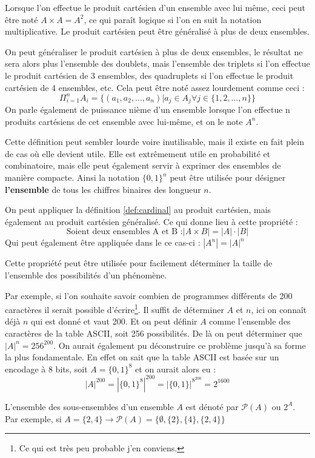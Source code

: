 Lorsque l'on effectue le produit cartésien d'un ensemble avec lui même, ceci peut être noté $A \times A = A^2$, ce qui paraît logique si l'on en suit la notation multiplicative. Le produit cartésien peut être généralisé à plus de deux ensembles.
\begin{mydef}\label{def:produit_cartésien_généralisé}
    On peut généraliser le produit cartésien à plus de deux ensembles, le résultat ne sera alors plus l'ensemble des doublets, mais l'ensemble des triplets si l'on effectue le produit cartésien de 3 ensembles, des quadruplets si l'on effectue le produit cartésien de 4 ensembles, etc.
    Cela peut être noté assez lourdement comme ceci :
    $$ \Pi_{i=1}^n A_i = \{(a_1, a_2, ..., a_n)| a_j \in A_j \forall j \in \{1,2,...,n\}\} $$
    On parle également de puissance nième d'un ensemble lorsque l'on effectue n produits cartésiens de cet ensemble avec lui-même, et on le note $A^n$.
\end{mydef}
Cette définition peut sembler lourde voire inutilisable, mais il existe en fait plein de cas où elle devient utile. Elle est extrêmement utile en probabilité et combinatoire, mais elle peut également servir à exprimer des ensembles de manière compacte. Ainsi la notation $ \{0,1\}^n$ peut être utilisée pour désigner \textbf{l'ensemble} de tous les chiffres binaires des longueur $n$.
\begin{myprop}
  On peut appliquer la définition \ref{def:cardinal} au produit cartésien, mais également au produit cartésien généralisé. Ce qui donne lieu à cette propriété :
  $$ \text{Soient deux ensembles A et B :} |A\times B| = |A| \cdot |B| $$
  Qui peut également être appliquée dans le ce cas-ci : $|A^n| = |A|^n$
\end{myprop}
Cette propriété peut être utilisée pour facilement déterminer la taille de l'ensemble des possibilités d'un phénomène.
\begin{myexem}
  Par exemple, si l'on souhaite savoir combien de programmes différents de 200 caractères il serait possible d'écrire\footnote{Ce qui est très peu probable j'en conviens.}. Il suffit de déterminer $A$ et $n$, ici on connaît déjà $n$ qui est donné et vaut 200. Et on peut définir $A$ comme l'ensemble des caractères de la table ASCII, soit 256 possibilités. De là on peut déterminer que $|A|^n = 256^{200}$. On aurait également pu déconstruire ce problème jusqu'à sa forme la plus fondamentale. En effet on sait que la table ASCII est basée sur un encodage à 8 bits, soit $A = \{0,1\}^8$ et on aurait alors eu :
  $$ |A|^{200} = |\{0,1\}^8|^{200} = |\{0,1\}|^{8^{200}} = 2^{1600}$$
\end{myexem}
\begin{mydef}
    L'ensemble des sous-ensembles d'un ensemble $A$ est dénoté par $\mathcal{P}(A)$ ou $2^A$.
    Par exemple, si $A = \{2,4\} \rightarrow \mathcal{P}(A) = \{ \emptyset, \{2\}, \{4\}, \{2,4\} \} $
\end{mydef}

